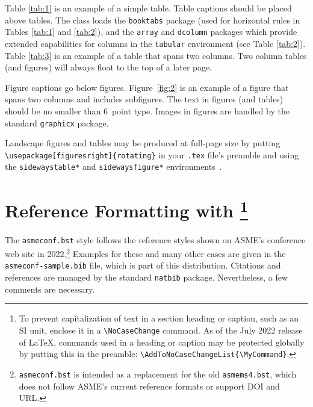 \documentclass[captionpatch,colorlinks,upint,subscriptcorrection,varvw,mathalfa=cal=boondoxo,german]{asmeconf}
\begin{document}
Table \ref{tab:1} is an example of a simple table. Table captions should be placed above tables.
The class loads the \texttt{booktabs} package (used for horizontal rules in Tables \ref{tab:1} and \ref{tab:2}), and the \texttt{array} and \texttt{dcolumn} packages which provide extended capabilities for columns in the \texttt{tabular} environment (see Table \ref{tab:2}).  Table \ref{tab:3} is an example of a table that spans two columns. Two column tables (and figures) will always float to the top of a later page.

Figure captions go below figures. Figure~\ref{fig:2} is an example of a figure that spans two columns and includes subfigures. The text in figures (and tables) should be no smaller than 6~point type. Images in figures are handled by the standard \texttt{graphicx} package.

Landscape figures and tables may be produced at full-page size by putting \verb|\usepackage[figuresright]{rotating}| in your \texttt{.tex} file's preamble and using the \texttt{sidewaystable*} and \texttt{sidewaysfigure*} environments~\cite{fairbairns}.



\section{Reference Formatting with \footnote{To prevent capitalization of text in a section heading or caption, such as an SI unit, enclose it in a \texttt{\textbackslash NoCaseChange} command. As of the July 2022 release of \LaTeX, commands used in a heading or caption may be protected globally by putting this in the preamble: \texttt{\textbackslash AddToNoCaseChangeList\{\textbackslash MyCommand\}}.}}\label{sec:references}

The {\upshape\texttt{asmeconf.bst}}   style follows the reference styles shown on ASME's conference web site in  2022.\footnote{\texttt{asmeconf.bst} is intended as a replacement for the old \texttt{asmems4.bst}, which does not follow ASME's current reference formats or support DOI and URL.}
Examples for these and many other cases are given in the \texttt{asmeconf-sample.bib} file, which is part of this distribution. Citations and references are managed by the standard \texttt{natbib} package.  Nevertheless, a few comments are necessary. 

\end{document}
